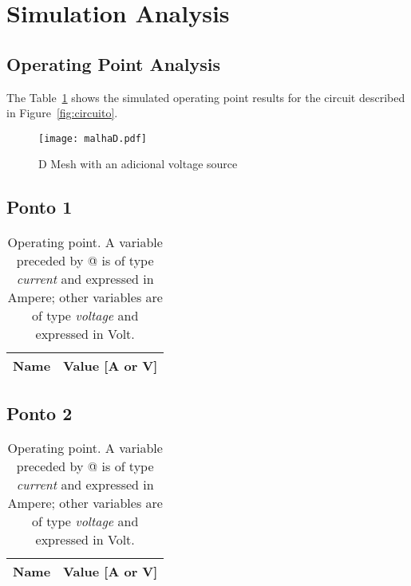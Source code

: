 \section{Simulation Analysis}
\label{sec:simulation}

\subsection{Operating Point Analysis}


The Table~\ref{tab:op1} shows the simulated operating point results for the circuit described in Figure~\ref{fig:circuito}.

\begin{figure}[h] \centering
\texttt{[image: malhaD.pdf]}
\caption{D Mesh with an adicional voltage source} %
\label{fig:malhaD}
\end{figure}


\subsection{Ponto 1}

\begin{table}[h]
  \centering
  \begin{tabular}{|l|r|}
    \hline    
    {\bf Name} & {\bf Value [A or V]} \\ \hline
    
  \end{tabular}
  \caption{Operating point. A variable preceded by @ is of type {\em current}
    and expressed in Ampere; other variables are of type {\it voltage} and expressed in
    Volt.}
  \label{tab:op1}
\end{table}

\subsection{Ponto 2}

\begin{table}[h]
  \centering
  \begin{tabular}{|l|r|}
    \hline    
    {\bf Name} & {\bf Value [A or V]} \\ \hline
    
  \end{tabular}
  \caption{Operating point. A variable preceded by @ is of type {\em current}
    and expressed in Ampere; other variables are of type {\it voltage} and expressed in
    Volt.}
  \label{tab:op2}
\end{table}

